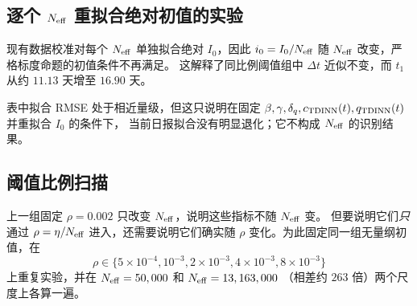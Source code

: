 \documentclass[UTF8]{ctexart}
\begin{document}
\subsection{逐个 $N_{\rm eff}$ 重拟合绝对初值的实验}
现有数据校准对每个 $N_{\rm eff}$ 单独拟合绝对 $I_0$，因此
$i_0=I_0/N_{\rm eff}$ 随 $N_{\rm eff}$ 改变，严格标度命题的初值条件不再满足。
这解释了同比例阈值组中 $\Delta t$ 近似不变，而 $t_1$ 从约 $11.13$ 天增至 $16.90$ 天。

\noindent{}

表中拟合 RMSE 处于相近量级，但这只说明在固定
$\beta,\gamma,\delta_q,c_{\rm TDINN}(t),q_{\rm TDINN}(t)$ 并重拟合 $I_0$ 的条件下，
当前日报拟合没有明显退化；它不构成 $N_{\rm eff}$ 的识别结果。

\subsection{阈值比例扫描}
上一组固定 $\rho=0.002$ 只改变 $N_{\rm eff}$，说明这些指标不随 $N_{\rm eff}$ 变。
但要说明它们\emph{只}通过 $\rho=\eta/N_{\rm eff}$ 进入，还需要说明它们确实随 $\rho$
变化。为此固定同一组无量纲初值，在
\[
\rho\in\{5\times10^{-4},10^{-3},2\times10^{-3},4\times10^{-3},8\times10^{-3}\}
\]
上重复实验，并在 $N_{\rm eff}=50,000$ 和 $N_{\rm eff}=13,163,000$
（相差约 $263$ 倍）两个尺度上各算一遍。
\end{document}
